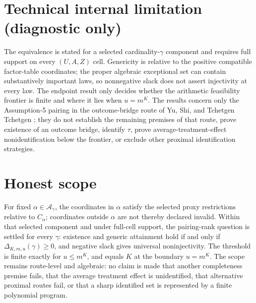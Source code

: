 \documentclass{article}
\begin{document}
\section*{Technical internal limitation (diagnostic only)}

The equivalence is stated for a selected cardinality-\(\gamma\) component and requires full support on every \((U,A,Z)\) cell. Genericity is relative to the positive compatible factor-table coordinates; the proper algebraic exceptional set can contain substantively important laws, so nonnegative slack does not assert injectivity at every law. The endpoint result only decides whether the arithmetic feasibility frontier is finite and where it lies when \(u=m^K\). The results concern only the Assumption-5 pairing in the outcome-bridge route of Yu, Shi, and Tchetgen Tchetgen \cite{YuShiTchetgen2025}; they do not establish the remaining premises of that route, prove existence of an outcome bridge, identify \(\tau\), prove average-treatment-effect nonidentification below the frontier, or exclude other proximal identification strategies.

\section{Honest scope}

For fixed \(\alpha\in\mathcal A_\gamma\), the coordinates in \(\alpha\) satisfy the selected proxy restrictions relative to \(C_\alpha\); coordinates outside \(\alpha\) are not thereby declared invalid. Within that selected component and under full-cell support, the pairing-rank question is settled for every \(\gamma\): existence and generic attainment hold if and only if \(\Delta_{K,m,u}(\gamma)\ge0\), and negative slack gives universal noninjectivity. The threshold is finite exactly for \(u\le m^K\), and equals \(K\) at the boundary \(u=m^K\). The scope remains route-level and algebraic: no claim is made that another completeness premise fails, that the average treatment effect is unidentified, that alternative proximal routes fail, or that a sharp identified set is represented by a finite polynomial program.
\end{document}
